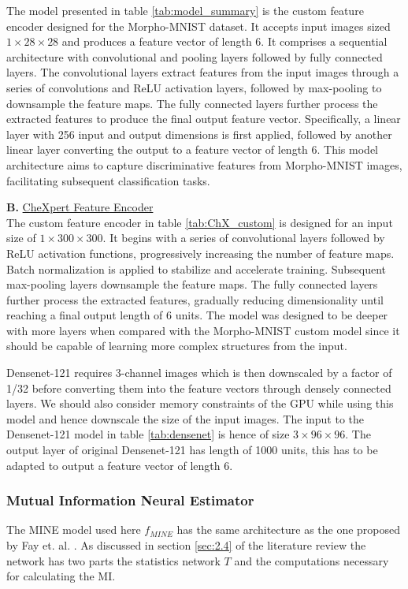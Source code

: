 \documentclass[12pt,DIV14,BCOR12mm,a4paper,footinclude=false,headinclude,parskip=half-,twoside,openright,cleardoublepage=empty,toc=index,bibliography=totoc,listof=totoc]{scrreprt}
\numberwithin{equation}{chapter}
\begin{document}
The model presented in table \ref{tab:model_summary} is the custom feature encoder designed for the Morpho-MNIST dataset. It accepts input images sized $1 \times 28 \times 28$ and produces a feature vector of length 6. It comprises a sequential architecture with convolutional and pooling layers followed by fully connected layers. The convolutional layers extract features from the input images through a series of convolutions and ReLU activation layers, followed by max-pooling to downsample the feature maps. The fully connected layers further process the extracted features to produce the final output feature vector. Specifically, a linear layer with 256 input and output dimensions is first applied, followed by another linear layer converting the output to a feature vector of length 6. This model architecture aims to capture discriminative features from Morpho-MNIST images, facilitating subsequent classification tasks.

\vspace{0.5cm}
\textbf{B.} \underline{CheXpert Feature Encoder}\\


The custom feature encoder in table \ref{tab:ChX_custom} is designed for an input size of $1 \times 300 \times 300$. It begins with a series of convolutional layers followed by ReLU activation functions, progressively increasing the number of feature maps. Batch normalization is applied to stabilize and accelerate training. Subsequent max-pooling layers downsample the feature maps. The fully connected layers further process the extracted features, gradually reducing dimensionality until reaching a final output length of 6 units. The model was designed to be deeper with more layers when compared with the Morpho-MNIST custom model since it should be capable of learning more complex structures from the input.

Densenet-121 requires 3-channel images which is then downscaled by a factor of 1/32 before converting them into the feature vectors through densely connected layers. We should also consider memory constraints of the GPU while using this model and hence downscale the size of the input images. The input to the Densenet-121 model in table \ref{tab:densenet} is hence of size $3\times96\times96$. The output layer of original Densenet-121 has length of 1000 units, this has to be adapted to output a feature vector of length 6.

\subsubsection{Mutual Information Neural Estimator}
The MINE model used here $f_{MINE}$ has the same architecture as the one proposed by Fay et. al. \cite{10162210}. As discussed in section \ref{sec:2.4} of the literature review the network has two parts the statistics network $T$ and the computations necessary for calculating the MI. 
\end{document}

